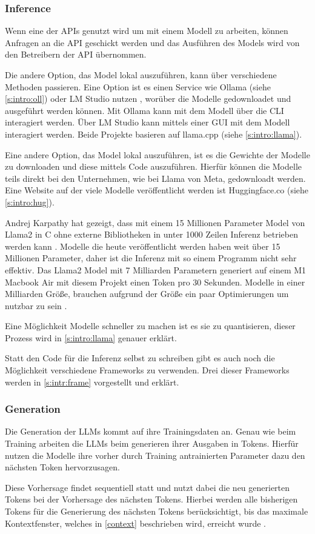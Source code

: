 \subsubsection{Inference}
Wenn eine der APIs genutzt wird um mit einem Modell zu arbeiten, können Anfragen an die API geschickt werden
 und das Ausführen des Models wird von den Betreibern der API übernommen.\par
Die andere Option, das Model lokal auszuführen, kann über verschiedene Methoden passieren. Eine Option ist es einen Service
wie Ollama (siehe \ref{s:intro:oll}) oder LM Studio nutzen \cite{LMStudioDiscover}, worüber 
die Modelle gedownloadet und ausgeführt werden können. Mit Ollama kann mit dem Modell über die CLI 
interagiert werden. 
Über LM Studio kann mittels einer GUI mit dem Modell interagiert werden. Beide Projekte basieren auf llama.cpp (siehe \ref{s:intro:llama}).\par
Eine andere Option, das Model lokal auszuführen, ist es die Gewichte der Modelle zu downloaden und diese mittels 
Code auszuführen. Hierfür können die Modelle teils direkt bei den Unternehmen, wie bei Llama von Meta, gedownloadt werden.
Eine Website auf der viele Modelle veröffentlicht werden ist Huggingface.co (siehe \ref*{s:intro:hug}).\par
Andrej Karpathy \cite{KarpathyAndrej} hat gezeigt, dass mit einem 15 Millionen Parameter Model von Llama2 in C ohne externe Bibliotheken in
unter 1000 Zeilen Inferenz betrieben werden kann \cite{Llama2RunMaster}. Modelle die heute veröffentlicht werden haben weit über 15 Millionen Parameter,
 daher ist die Inferenz mit so einem Programm nicht sehr effektiv. Das Llama2 Model mit 7 Milliarden Parametern generiert auf einem M1 
Macbook Air mit diesem Projekt einen Token pro 30 Sekunden. Modelle in einer Milliarden Größe, brauchen aufgrund der 
Größe ein paar Optimierungen um nutzbar zu sein \cite{Llama2RunMaster}. \par 
Eine Möglichkeit Modelle schneller zu machen ist es sie zu quantisieren, dieser Prozess wird in \ref{s:intro:llama} genauer 
erklärt.\par
Statt den Code für die Inferenz selbst zu schreiben gibt es auch noch die Möglichkeit verschiedene Frameworks zu verwenden.
Drei dieser Frameworks werden in \ref*{s:intr:frame} vorgestellt und erklärt.\par

\subsubsection{Generation}
Die Generation der LLMs kommt auf ihre Trainingsdaten an. Genau wie beim Training arbeiten die LLMs 
beim generieren ihrer Ausgaben in Tokens. Hierfür nutzen die Modelle ihre vorher durch Training 
antrainierten Parameter dazu den nächsten Token hervorzusagen.\par
Diese Vorhersage findet sequentiell statt und nutzt dabei die neu generierten Tokens bei der Vorhersage 
des nächsten Tokens. Hierbei werden alle bisherigen Tokens
für die Generierung des nächsten Tokens berücksichtigt, bis das maximale Kontextfenster, welches in 
\ref*{context} beschrieben wird, erreicht wurde \cite{GenerationLLMs}. 

